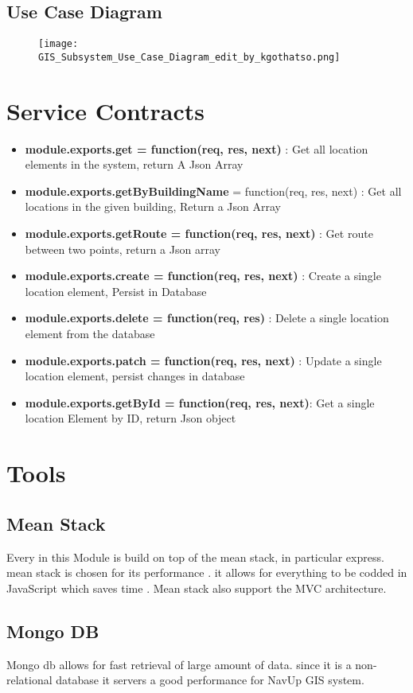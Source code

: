 \documentclass{article}
\begin{document}
	\subsection{Use Case Diagram}
		\begin{figure}[H]
			\texttt{[image: GIS\_Subsystem\_Use\_Case\_Diagram\_edit\_by\_kgothatso.png]}
		\end{figure}
	
\section{Service Contracts}
	
		\begin{itemize}
 			\item \textbf{module.exports.get = function(req, res, next)} : Get all location elements in the system, return A Json  Array
  			\item  \textbf{module.exports.getByBuildingName} = function(req, res, next) : Get all locations in the given building, Return a Json Array
  			\item \textbf{module.exports.getRoute = function(req, res, next)} : Get route between two points, return a Json array
  			\item \textbf{module.exports.create = function(req, res, next)} : Create a single location element, Persist in Database
  			\item \textbf{module.exports.delete = function(req, res)} : Delete a single location element from the database
  			\item \textbf{module.exports.patch = function(req, res, next)} : Update a single location element, persist changes in database
  			\item \textbf{module.exports.getById = function(req, res, next)}: Get a single location Element by ID, return Json object
		\end{itemize}
\section{Tools}
	\subsection{Mean Stack}
		Every in this Module is build on top of the mean stack, in particular express. mean stack is chosen for its performance 
		. it allows for everything to be codded in JavaScript which saves time . Mean stack also support the MVC architecture.
	\subsection{Mongo DB}
		Mongo db allows for fast retrieval of large amount of data. since it is a non-relational database it servers a good 				performance for NavUp GIS system.
\end{document}
